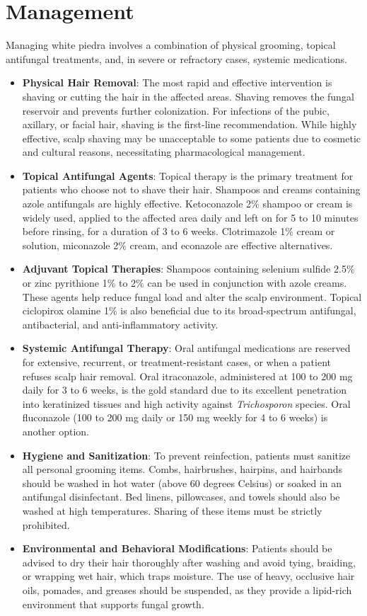 \section*{Management}
Managing white piedra involves a combination of physical grooming, topical antifungal treatments, and, in severe or refractory cases, systemic medications.

\begin{itemize}
    \item \textbf{Physical Hair Removal}: The most rapid and effective intervention is shaving or cutting the hair in the affected areas. Shaving removes the fungal reservoir and prevents further colonization. For infections of the pubic, axillary, or facial hair, shaving is the first-line recommendation. While highly effective, scalp shaving may be unacceptable to some patients due to cosmetic and cultural reasons, necessitating pharmacological management.
    \item \textbf{Topical Antifungal Agents}: Topical therapy is the primary treatment for patients who choose not to shave their hair. Shampoos and creams containing azole antifungals are highly effective. Ketoconazole 2\% shampoo or cream is widely used, applied to the affected area daily and left on for 5 to 10 minutes before rinsing, for a duration of 3 to 6 weeks. Clotrimazole 1\% cream or solution, miconazole 2\% cream, and econazole are effective alternatives.
    \item \textbf{Adjuvant Topical Therapies}: Shampoos containing selenium sulfide 2.5\% or zinc pyrithione 1\% to 2\% can be used in conjunction with azole creams. These agents help reduce fungal load and alter the scalp environment. Topical ciclopirox olamine 1\% is also beneficial due to its broad-spectrum antifungal, antibacterial, and anti-inflammatory activity.
    \item \textbf{Systemic Antifungal Therapy}: Oral antifungal medications are reserved for extensive, recurrent, or treatment-resistant cases, or when a patient refuses scalp hair removal. Oral itraconazole, administered at 100 to 200 mg daily for 3 to 6 weeks, is the gold standard due to its excellent penetration into keratinized tissues and high activity against \textit{Trichosporon} species. Oral fluconazole (100 to 200 mg daily or 150 mg weekly for 4 to 6 weeks) is another option.
    \item \textbf{Hygiene and Sanitization}: To prevent reinfection, patients must sanitize all personal grooming items. Combs, hairbrushes, hairpins, and hairbands should be washed in hot water (above 60 degrees Celsius) or soaked in an antifungal disinfectant. Bed linens, pillowcases, and towels should also be washed at high temperatures. Sharing of these items must be strictly prohibited.
    \item \textbf{Environmental and Behavioral Modifications}: Patients should be advised to dry their hair thoroughly after washing and avoid tying, braiding, or wrapping wet hair, which traps moisture. The use of heavy, occlusive hair oils, pomades, and greases should be suspended, as they provide a lipid-rich environment that supports fungal growth.
\end{itemize}

